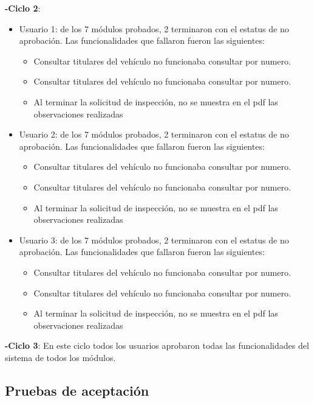 \textbf{-Ciclo 2}: 
\begin{itemize}
	\item Usuario 1: de los 7 módulos probados, 2 terminaron con el estatus de no aprobación. Las funcionalidades que fallaron fueron las siguientes:
	 \begin{itemize}
			\item Consultar titulares del vehículo no funcionaba consultar por numero.
			\item Consultar titulares del vehículo no funcionaba consultar por numero.
			\item Al terminar la solicitud de inspección, no se muestra en el pdf las observaciones realizadas
		  \end{itemize}

	\item Usuario 2: de los 7 módulos probados, 2 terminaron con el estatus de no aprobación. Las funcionalidades que fallaron fueron las siguientes:
	 \begin{itemize}
	 		\item Consultar titulares del vehículo no funcionaba consultar por numero.
			\item Consultar titulares del vehículo no funcionaba consultar por numero.
			\item Al terminar la solicitud de inspección, no se muestra en el pdf las observaciones realizadas
		  \end{itemize}

	\item Usuario 3: de los 7 módulos probados, 2 terminaron con el estatus de no aprobación. Las funcionalidades que fallaron fueron las siguientes:
	 \begin{itemize}
			\item Consultar titulares del vehículo no funcionaba consultar por numero.
			\item Consultar titulares del vehículo no funcionaba consultar por numero.
			\item Al terminar la solicitud de inspección, no se muestra en el pdf las observaciones realizadas
		  \end{itemize}

\end{itemize}

\textbf{-Ciclo 3}: En este ciclo todos los usuarios aprobaron todas las funcionalidades del sistema de todos los módulos.

\setlength{\parskip}{0mm}

\subsection{Pruebas de aceptación}
\setlength{\parskip}{5mm}

